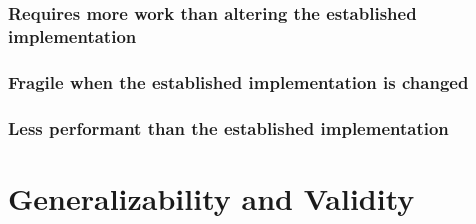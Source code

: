 \subsubsection{Requires more work than altering the established
  implementation}

\subsubsection{Fragile when the established implementation is changed}

\subsubsection{Less performant than the established implementation}

\section{Generalizability and Validity}

%
%
%
